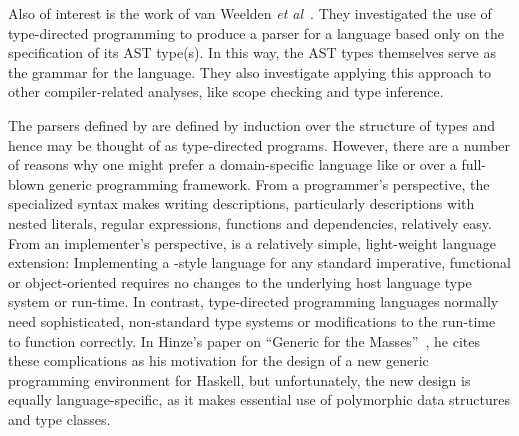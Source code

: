 Also of interest is the work of 
van Weelden \textit{et al}~\cite{weelden+:polytypic-ast}.
They investigated the use of
type-directed programming to produce a parser for a language based only on
the specification of its AST type(s). In this way, the AST types
themselves serve as the grammar for the language. They also
investigate applying this approach to other compiler-related analyses,
like scope checking and type inference.

The parsers defined by \ddc{} are defined by induction over the structure
of types and hence may be thought of as type-directed programs.  However,
there are a number of reasons why one might prefer a domain-specific
language like \pads{} or \ddc{} over a full-blown
generic programming framework.  
From a programmer's perspective, the specialized syntax makes writing
descriptions, particularly descriptions with nested literals, 
regular expressions, functions and dependencies, relatively easy.
From an implementer's perspective, \pads{} is a
relatively simple, light-weight language extension:  Implementing a 
\pads{}-style language for any standard imperative, functional or 
object-oriented requires no changes to the underlying host language
type system or run-time.  In contrast, type-directed
programming languages normally need sophisticated, non-standard type systems
or modifications to the run-time to function correctly.  In Hinze's
paper on ``Generic for the Masses''~\cite{hinze:masses}, he cites these
complications as his motivation for the design of a new generic programming
environment for Haskell, but unfortunately, the new design is equally 
language-specific, as it makes essential use of polymorphic data structures
and type classes.  







